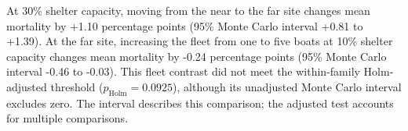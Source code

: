 At 30\% shelter capacity, moving from the near to the far site changes mean mortality by +1.10 percentage points (95\% Monte Carlo interval +0.81 to +1.39). At the far site, increasing the fleet from one to five boats at 10\% shelter capacity changes mean mortality by -0.24 percentage points (95\% Monte Carlo interval -0.46 to -0.03). This fleet contrast did not meet the within-family Holm-adjusted threshold ($p_{\mathrm{Holm}}=0.0925$), although its unadjusted Monte Carlo interval excludes zero. The interval describes this comparison; the adjusted test accounts for multiple comparisons.
